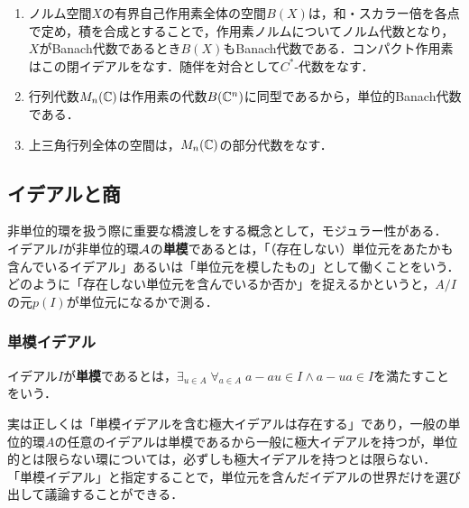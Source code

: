 \documentclass[uplatex,dvipdfmx]{jsreport}
\begin{document}
\begin{example}[Banの内部ホム]\mbox{}
    \begin{enumerate}
        \item ノルム空間$X$の有界自己作用素全体の空間$B(X)$は，和・スカラー倍を各点で定め，積を合成とすることで，作用素ノルムについてノルム代数となり，$X$がBanach代数であるとき$B(X)$もBanach代数である．コンパクト作用素はこの閉イデアルをなす．随伴を対合として$C^*$-代数をなす．
        \item 行列代数$M_n(\mathbb{C})$は作用素の代数$B(\mathbb{C}^n)$に同型であるから，単位的Banach代数である．
        \item 上三角行列全体の空間は，$M_n(\mathbb{C})$の部分代数をなす．
    \end{enumerate}
\end{example}



\subsection{イデアルと商}

\begin{tcolorbox}[colframe=ForestGreen, colback=ForestGreen!10!white,breakable,colbacktitle=ForestGreen!40!white,coltitle=black,fonttitle=\bfseries\sffamily,
title=]
    非単位的環を扱う際に重要な橋渡しをする概念として，モジュラー性がある．
    イデアル$I$が非単位的環$\mathcal{A}$の\textbf{単模}であるとは，「（存在しない）単位元をあたかも含んでいるイデアル」あるいは「単位元を模したもの」として働くことをいう．
    どのように「存在しない単位元を含んでいるか否か」を捉えるかというと，$A/I$の元$p(I)$が単位元になるかで測る．
\end{tcolorbox}

\subsubsection{単模イデアル}

\begin{definition}
    イデアル$I$が\textbf{単模}であるとは，$\exists_{u\in A}\;\forall_{a\in A}\;a-au\in I\land a-ua\in I$を満たすことをいう．
\end{definition}
\begin{remarks}[退化した消息]
    実は正しくは「単模イデアルを含む極大イデアルは存在する」であり，一般の単位的環$A$の任意のイデアルは単模であるから一般に極大イデアルを持つが，単位的とは限らない環については，必ずしも極大イデアルを持つとは限らない．
    「単模イデアル」と指定することで，単位元を含んだイデアルの世界だけを選び出して議論することができる．
\end{remarks}
\end{document}
